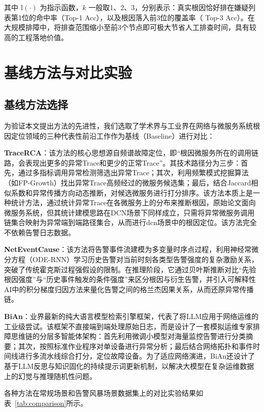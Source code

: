 其中 $\mathbb{I}(\cdot)$ 为指示函数，$k$ 一般取1、2、3，分别表示：真实根因恰好排在嫌疑列表第1位的命中率（Top-1 Acc），以及根因落入前3位的覆盖率（ Top-3 Acc）。在大规模排障中，将排查范围缩小至前3个节点即可极大节省人工排查时间，具有较高的工程落地价值。
\section{基线方法与对比实验}
\subsection{基线方法选择}

为验证本文提出方法的先进性，我们选取了学术界与工业界在网络与微服务系统根因定位领域的三种代表性前沿工作作为基线（Baseline）进行对比：


 \textbf{TraceRCA}：该方法的核心思想源自频谱故障定位，即“根因微服务所在的调用链路，会表现出更多的异常Trace和更少的正常Trace”。其技术路径分为三步：首先，通过多指标调用异常检测筛选出异常Trace；其次，利用频繁模式挖掘算法（如FP-Growth）找出异常Trace高频经过的微服务候选集；最后，结合Jaccard相似系数和异常传播方向动态推断，对候选微服务进行打分排序。该方法本质上是一种统计方法，通过统计异常Trace在各微服务上的分布来推断根因，原始论文面向微服务系统，但其统计建模思路在DCN场景下同样成立，只需将异常微服务调用链集合映射为异常端到端路径集合，从而进行dcn场景中的根因定位。该方法完全不依赖告警日志数据。

\textbf{NetEventCause}：该方法将告警事件流建模为多变量时序点过程，利用神经常微分方程（ODE-RNN）学习历史告警对当前时刻各类型告警强度的复杂激励关系，突破了传统霍克斯过程强假设的限制。在推理阶段，它通过贝叶斯推断对比“先验根因强度”与“历史事件触发的条件强度”来区分根因与衍生告警，并引入可解释性AI中的积分梯度归因方法来量化告警之间的格兰杰因果关系，从而还原异常传播链。

 \textbf{BiAn}：业界最新的纯大语言模型检索引擎框架，代表了将LLM应用于网络运维的工业级尝试。该框架不直接端到端处理原始日志，而是设计了一套模拟运维专家排障思维链的分层多智能体架构：首先利用微调小模型对海量监控告警进行分类摘要；其次，按照标准作业程序对单设备进行异常分析；最后结合网络拓扑和事件时间线进行多流水线综合打分，定位故障设备。为了适应网络演进，BiAn还设计了基于LLM反思与知识固化的持续提示词更新机制，以解决大模型在复杂运维数据上的幻觉与推理随机性问题。


各种方法在常规场景和告警风暴场景数据集上的对比实验结果如表~\ref{tab:comparison}所示。

